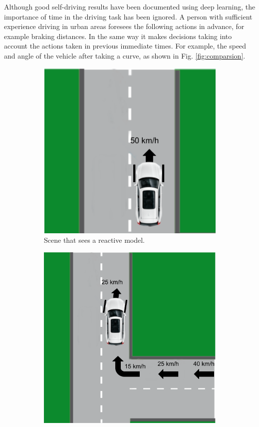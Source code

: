 \documentclass[conference]{IEEEtran}
\begin{document}
Although good self-driving results have been documented using deep learning, the importance of time in the driving task has been ignored. A person with sufficient experience driving in urban areas foresees the following actions in advance, for example braking distances. In the same way it makes decisions taking into account the actions taken in previous immediate times. For example, the speed and angle of the vehicle after taking a curve, as shown in Fig. \ref{fig:comparsion}.

\begin{figure}[h]
	\centering
	\begin{subfigure}{0.22\textwidth} 
		\includegraphics[width=\textwidth]{img/reactive}
		\caption{Scene that sees a reactive model.} 
		\label{subfig:reactive}
	\end{subfigure}
	\begin{subfigure}{0.22\textwidth} 
		\includegraphics[width=\textwidth]{img/recurrent}

\end{subfigure}
\end{figure}
\end{document}
